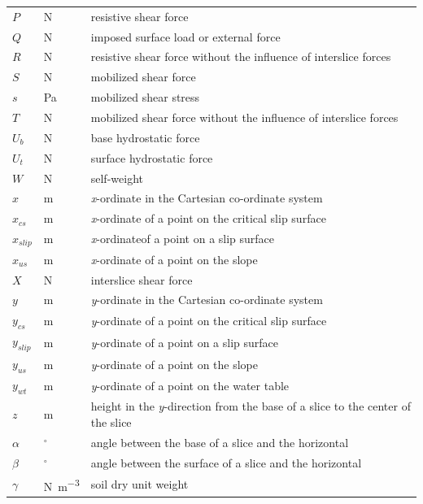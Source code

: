 \documentclass[12pt]{article}
\begin{document}
\begin{longtable*}{  l  l  p{8.5cm}  }
\\
$P$ & \si{\newton} & resistive shear force
\\
$Q$ & \si{\newton} & imposed surface load or external force
\\
$R$ & \si{\newton} & resistive shear force without the influence of interslice 
forces
\\
$S$ & \si{\newton} & mobilized shear force
\\
$s$ &\si{\pascal} & mobilized shear stress
\\
$T$ & \si{\newton} & mobilized shear force without the influence of interslice 
forces
\\
${U_{b}}$ & \si{\newton} & base hydrostatic force
\\
${U_{t}}$ & \si{\newton} & surface hydrostatic force
\\
$W$ & \si{\newton} & self-weight
\\
$x$ & \si{\meter}& \textit{x}-ordinate in the Cartesian co-ordinate system
\\
$x_{cs}$ & \si{\meter} & \textit{x}-ordinate of a point on the critical slip 
surface
\\
${x_{slip}}$ &  \si{\meter}& \textit{x}-ordinateof a point on a slip surface
\\
${x_{us}}$ &  \si{\meter}& \textit{x}-ordinate of a point on the slope
\\
$X$ & \si{\newton} & interslice shear force
\\
$y$ &  \si{\meter}& \textit{y}-ordinate in the Cartesian co-ordinate system
\\
$y_{cs}$ & \si{\meter} & \textit{y}-ordinate of a point on the critical slip 
surface
\\
${y_{slip}}$ & \si{\meter}& \textit{y}-ordinate of a point on a slip surface
\\
${y_{us}}$ &  \si{\meter}& \textit{y}-ordinate of a point on the slope 
\\
${y_{wt}}$ &  \si{\meter}& \textit{y}-ordinate of a point on the water table
\\
$z$ & \si{\meter}& height in the \textit{y}-direction from the base of a slice 
to the center of the slice
\\
$\alpha{}$ & ${}^{\circ}$ & angle between the base of a slice and the horizontal
\\
$\beta{}$ &${}^{\circ}$ & angle between the surface of a slice and the 
horizontal
\\
$\gamma{}$ & \si{\newton\per\cubic\meter} & soil dry unit weight
\\

\end{longtable*}
\end{document}
